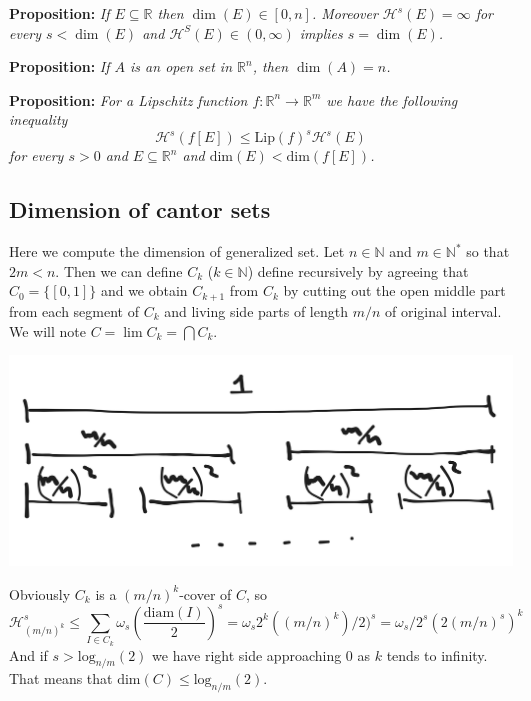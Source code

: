 \vspace{2ex}
\textbf{Proposition:} \textit{If $E\subseteq\mathbb R$ then $\dim(E)\in [0, n]$.
Moreover $\mathcal H^s(E)=\infty$ for every $s<\dim(E)$ and $\mathcal H^S(E)\in
(0,\infty)$ implies $s=\dim(E)$.}

\vspace{2ex}
\textbf{Proposition:} \textit{If $A$ is an open set in $\mathbb R^n$, then $\dim
(A) = n$.}

\vspace{2ex}
\textbf{Proposition:} \textit{For a Lipschitz function $f:\mathbb{R}^n\rightarrow
\mathbb{R}^m$ we have the following inequality
\[ \mathcal{H}^s(f[E])\leq\text{Lip}(f)^s\mathcal{H}^s(E) \]
for every $s>0$ and $E\subseteq\mathbb{R}^n$ and $\text{dim}(E)<\text{dim}(f[E])$.}

\subsection{Dimension of cantor sets}
Here we compute the dimension of generalized set. Let $n\in\mathbb{N}$ and
$m\in\mathbb{N}^*$ so that $2m<n$. Then we can define $C_k$ ($k\in\mathbb{N}$)
define recursively by agreeing that $C_0=\{[0,1]\}$ and we obtain $C_{k+1}$ from $C_k$
by cutting out the open middle part from each segment of $C_k$ and living side parts
of length $m/n$ of original interval. We will note $C=\lim C_k=\bigcap C_k$.
\begin{center}
\includegraphics[scale=0.15]{cantor.png}
\end{center}
Obviously $C_k$ is a $(m/n)^k$-cover of $C$, so
\[ \mathcal{H}_{(m/n)^k}^s \leq \sum_{I\in C_k}\omega_s(\frac{\text{diam}(I)}{2})^s
=\omega_s2^k((m/n)^k)/2)^s=\omega_s/2^s(2(m/n)^s)^k \]
And if $s>\text{log}_{n/m}(2)$ we have right side approaching 0 as $k$ tends to
infinity. That means that $\text{dim}(C)\leq\text{log}_{n/m}(2)$.


